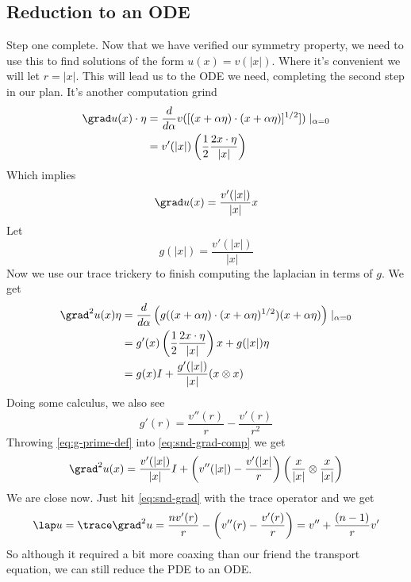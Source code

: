 \documentclass{bkcnotes}
\begin{document}
\subsection{Reduction to an ODE}
Step one complete. Now that we have verified our symmetry property, we
need to use this to find solutions of the form $u(x) = v(|x|)$. Where
it's convenient we will let $r = |x|$. This will lead us to the ODE we
need, completing the second step in our plan. It's another computation
grind
\begin{equation}
  \label{eq:grad-u-comp}
  \begin{aligned}
    \grad u(x) \cdot \eta &= \frac{d}{d\alpha} v([(x+\alpha\eta)\cdot
    (x+\alpha\eta)]^{1/2}])\mid_{\alpha = 0} \\
    &= v'(|x|)\left(\frac{1}{2}\frac{2x\cdot\eta}{|x|}\right)
  \end{aligned}
\end{equation}
Which implies
\begin{equation}
  \label{eq:grad-u}
  \grad u(x) = \frac{v'(|x|)}{|x|}x
\end{equation}
Let
\begin{equation}
  \label{eq:g-def}
  g(|x|) = \frac{v'(|x|)}{|x|}
\end{equation}
Now we use our trace trickery to finish computing the laplacian in
terms of $g$. We get
\begin{equation}
  \label{eq:snd-grad-comp}
  \begin{aligned}
    \grad^2u(x) \eta &= \frac{d}{d\alpha}\left(g((x +
      \alpha\eta)\cdot(x +
      \alpha\eta)^{1/2})(x+\alpha\eta)\right)\mid_{\alpha = 0} \\
    &= g'(x)\left(\frac{1}{2}\frac{2x\cdot\eta}{|x|}\right) x + g(|x|)\eta \\
    &= g(x)I + \frac{g'(|x|)}{|x|}(x \otimes x)
  \end{aligned}
\end{equation}
Doing some calculus, we also see
\begin{equation}
  \label{eq:g-prime-def}
  g'(r) = \frac{v''(r)}{r} - \frac{v'(r)}{r^2}
\end{equation}
Throwing \eqref{eq:g-prime-def} into \eqref{eq:snd-grad-comp} we get
\begin{equation}
  \label{eq:snd-grad}
  \grad^2u(x) =
  \frac{v'(|x|)}{|x|}I + \left(v''(|x|) - 
    \frac{v'(|x|}{r}\right)\left(\frac{x}{|x|} \otimes \frac{x}{|x|}\right)
\end{equation}
We are close now. Just hit \eqref{eq:snd-grad} with the trace operator
and we get
\begin{equation}
  \label{eq:laplace-ode}
  \lap u = \trace\grad^2 u
  = \frac{nv'(r)}{r} - \left(v''(r) - \frac{v'(r)}{r}\right)
  = v'' + \frac{(n-1)}{r}v'
\end{equation}
So although it required a bit more coaxing than our friend the
transport equation, we can still reduce the PDE to an ODE.
\end{document}
